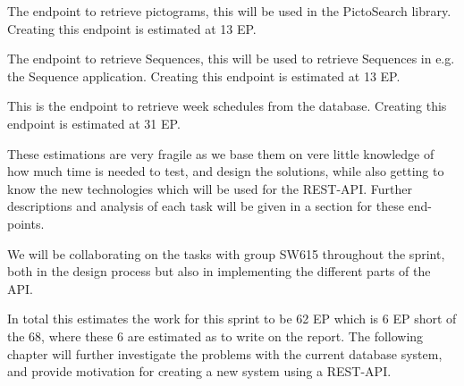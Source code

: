 \begin{description}[style=unboxed]
	\item [Endpoint for Pictograms] The endpoint to retrieve pictograms, this will be used in the PictoSearch library.
	Creating this endpoint is estimated at 13 EP.
	\item [Endpoint for Sequences] The endpoint to retrieve Sequences, this will be used to retrieve Sequences in e.g. the Sequence application.
	Creating this endpoint is estimated at 13 EP.
	\item [Endpoint for Week Schedules] This is the endpoint to retrieve week schedules from the database.
	Creating this endpoint is estimated at 31 EP.
\end{description}
These estimations are very fragile as we base them on vere little knowledge of how much time is needed to test, and design the solutions, while also getting to know the new technologies which will be used for the REST-API. 
Further descriptions and analysis of each task will be given in a section for these end-points.

We will be collaborating on the tasks with group SW615 throughout the sprint, both in the design process but also in implementing the different parts of the API. 

In total this estimates the work for this sprint to be 62 EP which is 6 EP short of the 68, where these 6 are estimated as to write on the report. 
The following chapter will further investigate the problems with the current database system, and provide motivation for creating a new system using a REST-API.
